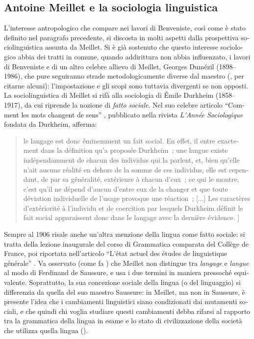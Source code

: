 \documentclass[french,output=paper,colorlinks,citecolor=brown]{../langscibook}
\begin{document}
\begin{otherlanguage}{italian}
\subsection{Antoine Meillet e la sociologia linguistica}

L’interesse antropologico che compare nei lavori di Benveniste, così come è stato definito nel paragrafo precedente, si discosta in molti aspetti dalla prospettiva sociolinguistica assunta da Meillet. Si è già sostenuto che questo interesse sociologico abbia dei tratti in comune, quando addirittura non abbia influenzato, i lavori di Benveniste e di un altro celebre allievo di Meillet, Georges Dumézil (1898--1986), che pure seguiranno strade metodologicamente diverse dal maestro (\citealt{Monod-Becquelin1988, Lincoln2012}, per citarne alcuni): l’impostazione e gli scopi sono tuttavia divergenti se non opposti. La sociolinguistica di Meillet si rifà alla sociologia di Émile Durkheim (1858--1917), da cui riprende la nozione di \textit{fatto} \textit{sociale}. Nel suo celebre articolo “Comment les mots changent de sens” \citep{Meillet1906a}, pubblicato nella rivista \textit{L’Année} \textit{Sociologique} fondata da Durkheim, afferma:

 
\begin{quote}
    le langage est donc éminemment un fait social. En effet, il entre exactement dans la définition qu’a proposée Durkheim~; une langue existe indépendamment de chacun des individus qui la parlent, et, bien qu’elle n’ait aucune réalité en dehors de la somme de ces individus, elle est cependant, de par sa généralité, extérieure à chacun d’eux~; ce qui le montre, c’est qu’il ne dépend d’aucun d’entre eux de la changer et que toute déviation individuelle de l’usage provoque une réaction~; [...{]} Les caractères d’extériorité à l’individu et de coercition par lesquels Durkheim définit le fait social apparaissent donc dans le langage avec la dernière évidence. \citep[230]{Meillet1906a}]
\end{quote}

Sempre al 1906 risale anche un’altra menzione della lingua come fatto sociale: si tratta della lezione inaugurale del corso di Grammatica comparata del Collège de France, poi riportata nell’articolo “L’état actuel des études de linguistique générale” \citep{Meillet1906b}. Va osservato (come fa \citealt[68]{Koerner1988}) che Meillet non distingue tra \textit{langage} e \textit{langue} al modo di Ferdinand de Saussure, e usa i due termini in maniera pressoché equivalente. Soprattutto, la sua concezione sociale della lingua (o del linguaggio) si differenzia da quella del suo maestro Saussure: in Meillet, ma non in Saussure, è presente l’idea che i cambiamenti linguistici siano condizionati dai mutamenti sociali, e che quindi chi voglia studiare questi cambiamenti debba rifarsi al rapporto tra la grammatica della lingua in esame e lo stato di civilizzazione della società che utilizza quella lingua (\citealt{Koerner1988, PuehRaynski1988, Wald2012}).


\end{otherlanguage}
\end{document}
